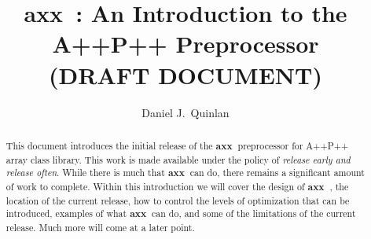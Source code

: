 \documentclass[10pt]{article}
\newcommand{\axx}{{\bf axx\ }}
\begin{document}
\title{ \axx: An Introduction to the A++\/P++ Preprocessor \\ 
                      (DRAFT DOCUMENT) }
\author{Daniel J.\ Quinlan }

\date{}

\maketitle

\tableofcontents


\begin{abstract}

   This document introduces the initial release of the \axx preprocessor for A++\/P++ array class
library.  This work is made available under the policy of {\em release early and release often}.  While there
is much that \axx can do, there remains a significant amount of work to complete.  Within this
introduction we will cover the design of \axx, the location of the current release, how to control
the levels of optimization that can be introduced, examples of what \axx can do, and some of the
limitations of the current release.  Much more will come at a later point.

\end{abstract}

\end{document}
